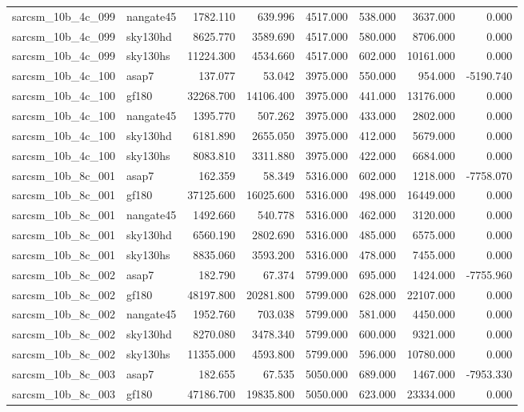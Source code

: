 \begin{tabular}{llrrrrrr}
sarcsm\_10b\_4c\_099 & nangate45 & 1782.110 & 639.996 & 4517.000 & 538.000 & 3637.000 & 0.000 \\
sarcsm\_10b\_4c\_099 & sky130hd & 8625.770 & 3589.690 & 4517.000 & 580.000 & 8706.000 & 0.000 \\
sarcsm\_10b\_4c\_099 & sky130hs & 11224.300 & 4534.660 & 4517.000 & 602.000 & 10161.000 & 0.000 \\
sarcsm\_10b\_4c\_100 & asap7 & 137.077 & 53.042 & 3975.000 & 550.000 & 954.000 & -5190.740 \\
sarcsm\_10b\_4c\_100 & gf180 & 32268.700 & 14106.400 & 3975.000 & 441.000 & 13176.000 & 0.000 \\
sarcsm\_10b\_4c\_100 & nangate45 & 1395.770 & 507.262 & 3975.000 & 433.000 & 2802.000 & 0.000 \\
sarcsm\_10b\_4c\_100 & sky130hd & 6181.890 & 2655.050 & 3975.000 & 412.000 & 5679.000 & 0.000 \\
sarcsm\_10b\_4c\_100 & sky130hs & 8083.810 & 3311.880 & 3975.000 & 422.000 & 6684.000 & 0.000 \\
sarcsm\_10b\_8c\_001 & asap7 & 162.359 & 58.349 & 5316.000 & 602.000 & 1218.000 & -7758.070 \\
sarcsm\_10b\_8c\_001 & gf180 & 37125.600 & 16025.600 & 5316.000 & 498.000 & 16449.000 & 0.000 \\
sarcsm\_10b\_8c\_001 & nangate45 & 1492.660 & 540.778 & 5316.000 & 462.000 & 3120.000 & 0.000 \\
sarcsm\_10b\_8c\_001 & sky130hd & 6560.190 & 2802.690 & 5316.000 & 485.000 & 6575.000 & 0.000 \\
sarcsm\_10b\_8c\_001 & sky130hs & 8835.060 & 3593.200 & 5316.000 & 478.000 & 7455.000 & 0.000 \\
sarcsm\_10b\_8c\_002 & asap7 & 182.790 & 67.374 & 5799.000 & 695.000 & 1424.000 & -7755.960 \\
sarcsm\_10b\_8c\_002 & gf180 & 48197.800 & 20281.800 & 5799.000 & 628.000 & 22107.000 & 0.000 \\
sarcsm\_10b\_8c\_002 & nangate45 & 1952.760 & 703.038 & 5799.000 & 581.000 & 4450.000 & 0.000 \\
sarcsm\_10b\_8c\_002 & sky130hd & 8270.080 & 3478.340 & 5799.000 & 600.000 & 9321.000 & 0.000 \\
sarcsm\_10b\_8c\_002 & sky130hs & 11355.000 & 4593.800 & 5799.000 & 596.000 & 10780.000 & 0.000 \\
sarcsm\_10b\_8c\_003 & asap7 & 182.655 & 67.535 & 5050.000 & 689.000 & 1467.000 & -7953.330 \\
sarcsm\_10b\_8c\_003 & gf180 & 47186.700 & 19835.800 & 5050.000 & 623.000 & 23334.000 & 0.000 \\

\end{tabular}
